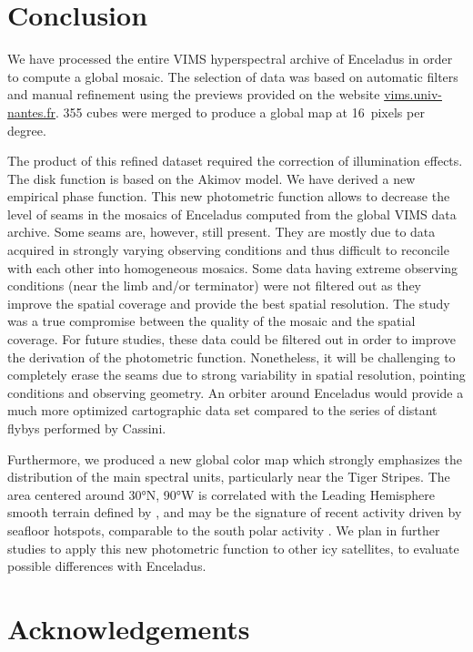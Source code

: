 \documentclass{arxiv-icarus}
\begin{document}
\section{Conclusion}

We have processed the entire VIMS hyperspectral archive of Enceladus in order to compute a global mosaic. The selection of data was based on automatic filters and manual refinement using the previews provided on the website \href{https://vims.univ-nantes.fr}{vims.univ-nantes.fr}. 355 cubes were merged to produce a global map at \SI{16}{pixels} per degree.

The product of this refined dataset required the correction of illumination effects. The disk function is based on the Akimov model. We have derived a new empirical phase function. This new photometric function allows to decrease the level of seams in the mosaics of Enceladus computed from the global VIMS data archive. Some seams are, however, still present. They are mostly due to data acquired in strongly varying observing conditions and thus difficult to reconcile with each other into homogeneous mosaics. Some data having extreme observing conditions (\eg near the limb and/or terminator) were not filtered out as they improve the spatial coverage and provide the best spatial resolution. The study was a true compromise between the quality of the mosaic and the spatial coverage. For future studies, these data could be filtered out in order to improve the derivation of the photometric function. Nonetheless, it will be challenging to completely erase the seams due to strong variability in spatial resolution, pointing conditions and observing geometry. An orbiter around Enceladus would provide a much more optimized cartographic data set compared to the series of distant flybys performed by Cassini.

Furthermore, we produced a new global color map which strongly emphasizes the distribution of the main spectral units, particularly near the Tiger Stripes. The area centered around \ang{30}N, \ang{90}W is correlated with the Leading Hemisphere smooth terrain defined by \cite{Crow-Willard2015}, and may be the signature of recent activity driven by seafloor hotspots, comparable to the south polar activity \citep{Choblet2017}. We plan in further studies to apply this new photometric function to other icy satellites, to evaluate possible differences with Enceladus.

\section*{Acknowledgements}
\end{document}
